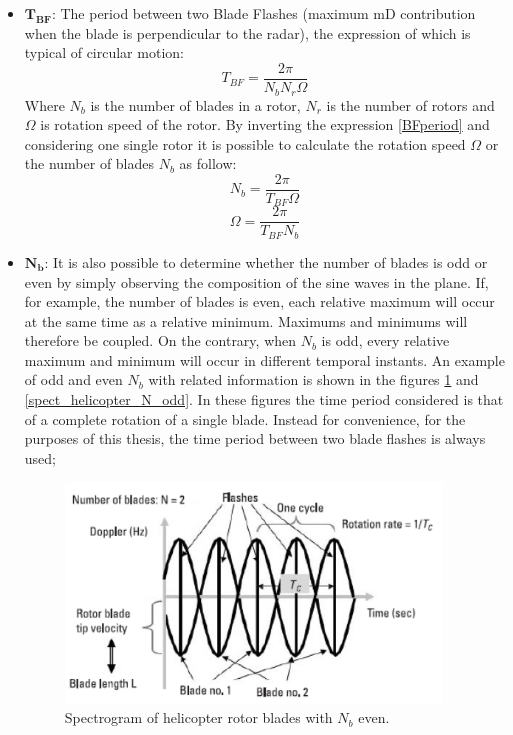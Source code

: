 \begin{itemize}
     \item $\mathbf{T_{BF}}$: The period between two Blade Flashes (maximum mD contribution when the blade is perpendicular to the radar), the expression of which is typical of circular motion: 
     \begin{equation}
        T_{BF}=\frac{2 \pi}{N_{b} N_{r} \Omega}
        \label{BFperiod}
     \end{equation}
    Where $N_{b}$ is the number of blades in a rotor, $N_{r}$ is the number of rotors and $\Omega$ is rotation speed of the rotor. By inverting the expression \ref{BFperiod} and considering one single rotor it is possible to calculate the rotation speed $\Omega$ or the number of blades $N_{b}$ as follow:
    \begin{equation}
    N_{b}=\frac{2 \pi}{T_{BF} \Omega}
    \end{equation}
    \begin{equation}
    \Omega=\frac{2 \pi}{T_{BF} N_{b}}
    \end{equation}
         
    \item $\mathbf{N_{b}}$: It is also possible to determine whether the number of blades is odd or even by simply observing the composition of the sine waves in the plane. If, for example, the number of blades is even, each relative maximum will occur at the same time as a relative minimum. Maximums and minimums will therefore be coupled. On the contrary, when $N_{b}$ is odd, every relative maximum and minimum will occur in different temporal instants. An example of odd and even $N_{b}$ with related information is shown in the figures \ref{spect_helicopter_N_even} and \ref{spect_helicopter_N_odd}. In these figures the time period considered is that of a complete rotation of a single blade. Instead for convenience, for the purposes of this thesis, the time period between two blade flashes is always used;
    
    \begin{figure}[h!]
    \centering
    \includegraphics[width=10cm]{FMCW mD analysis-chap4/img/F-t plane md N even.png}
    \caption{Spectrogram of helicopter rotor blades with $N_b$ even. \cite{microdoppler_chen}}
    \label{spect_helicopter_N_even}
    \end{figure}
    

\end{itemize}
